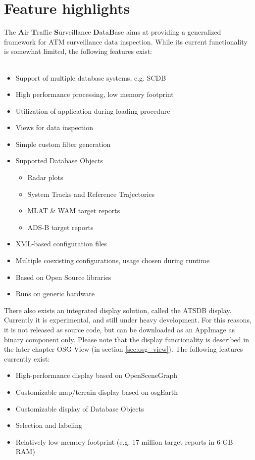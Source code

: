 \documentclass[10pt,letterpaper,extrafontsizes]{memoir}
\begin{document}
\section{Feature highlights}

The \textbf{A}ir \textbf{T}raffic \textbf{S}urveillance \textbf{D}ata\textbf{B}ase aims at providing a generalized framework for ATM surveillance data inspection. While its current functionality is somewhat limited, the following features exist:\\\\

\begin{itemize}  
\item Support of multiple database systems, e.g. SCDB
\item High performance processing, low memory footprint
\item Utilization of application during loading procedure
\item Views for data inspection
\item Simple custom filter generation
\item Supported Database Objects
\begin{itemize}  
\item Radar plots
\item System Tracks and Reference Trajectories
\item MLAT \& WAM target reports
\item ADS-B target reports
\end{itemize}
\item XML-based configuration files
\item Multiple coexisting configurations, usage chosen during runtime
\item Based on Open Source libraries
\item Runs on generic hardware
\end{itemize}

There also exists an integrated display solution, called the ATSDB display. Currently it is experimental, and still under heavy development. For this reasons, it is not released as source code, but can be downloaded as an AppImage as binary component only. Please note that the display functionality is described in the later chapter OSG View (in section \ref{sec:osg_view}). The following features currently exist:

\begin{itemize}  
\item High-performance display based on OpenSceneGraph
\item Customizable map/terrain display based on osgEarth
\item Customizable display of Database Objects
\item Selection and labeling
\item Relatively low memory footprint (e.g. 17 million target reports in 6 GB RAM)
\end{itemize}
\end{document}
